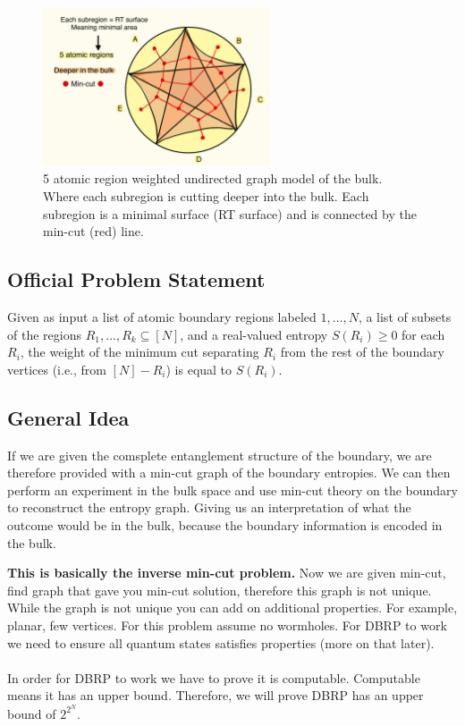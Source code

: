 \documentclass[12pt]{article}
\begin{document}
\begin{figure}[htbp]  %
    \centering
    \includegraphics[width=0.6\textwidth, height=0.23\textheight]{mincut_graph.jpeg}  %
    \caption{5 atomic region weighted undirected graph model of the bulk. Where each subregion is cutting deeper into the bulk. Each subregion is a minimal surface (RT surface) and is connected by the min-cut (red) line.}  %
    \label{fig:mincut}  %
\end{figure}

\newpage 

\subsection{Official Problem Statement}
\hspace{0.5cm} Given as input a list of atomic boundary regions labeled \( 1, \dots, N \), a list of subsets of the regions \( R_1, \dots, R_k \subseteq [N] \), and a real-valued entropy \( S(R_i) \geq 0 \) for each \( R_i \), the weight of the minimum cut separating \( R_i \) from the rest of the boundary vertices (i.e., from \( [N] - R_i \)) is equal to \( S(R_i) \).


\subsection{General Idea}
\hspace{0.5cm} If we are given the comsplete entanglement structure of the boundary, we are therefore provided with a min-cut graph of the boundary entropies. We can then perform an experiment in the bulk space and use min-cut theory on the boundary to reconstruct the entropy graph. Giving us an interpretation of what the outcome would be in the bulk, because the boundary information is encoded in the bulk.

\textbf{This is basically the inverse min-cut problem.} Now we are given min-cut, find graph that gave you min-cut solution, therefore this graph is not unique. While the graph is not unique you can add on additional properties. For example, planar, few vertices. For this problem assume no wormholes. For DBRP to work we need to ensure all quantum states satisfies properties (more on that later). \\
\\
\indent In order for DBRP to work we have to prove it is computable. Computable means it has an upper bound.
Therefore, we will prove DBRP has an upper bound of $2^{2^N}$.
\end{document}
